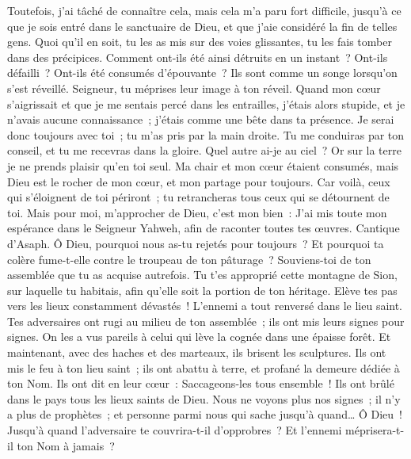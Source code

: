 \begin{multicols}{2}
Toutefois, j'ai tâché de connaître cela, mais cela m'a paru fort difficile,
jusqu'à ce que je sois entré dans le sanctuaire de Dieu, et que j'aie considéré la fin de telles gens.
Quoi qu'il en soit, tu les as mis sur des voies glissantes, tu les fais tomber dans des précipices.
Comment ont-ils été ainsi détruits en un instant~? Ont-ils défailli~? Ont-ils été consumés d'épouvante~?
Ils sont comme un songe lorsqu'on s'est réveillé. Seigneur, tu méprises leur image à ton réveil.
Quand mon cœur s'aigrissait et que je me sentais percé dans les entrailles,
j'étais alors stupide, et je n'avais aucune connaissance~; j'étais comme une bête dans ta présence.
Je serai donc toujours avec toi~; tu m'as pris par la main droite.
Tu me conduiras par ton conseil, et tu me recevras dans la gloire.
Quel autre ai-je au ciel~? Or sur la terre je ne prends plaisir qu'en toi seul.
Ma chair et mon cœur étaient consumés, mais Dieu est le rocher de mon cœur, et mon partage pour toujours.
Car voilà, ceux qui s'éloignent de toi périront~; tu retrancheras tous ceux qui se détournent de toi.
Mais pour moi, m'approcher de Dieu, c'est mon bien~: J'ai mis toute mon espérance dans le Seigneur Yahweh, afin de raconter toutes tes œuvres.
\VerseOne{}Cantique d'Asaph. Ô Dieu, pourquoi nous as-tu rejetés pour toujours~? Et pourquoi ta colère fume-t-elle contre le troupeau de ton pâturage~?
Souviens-toi de ton assemblée que tu as acquise autrefois. Tu t'es approprié cette montagne de Sion, sur laquelle tu habitais, afin qu'elle soit la portion de ton héritage.
Elève tes pas vers les lieux constamment dévastés~! L'ennemi a tout renversé dans le lieu saint.
Tes adversaires ont rugi au milieu de ton assemblée~; ils ont mis leurs signes pour signes.
On les a vus pareils à celui qui lève la cognée dans une épaisse forêt.
Et maintenant, avec des haches et des marteaux, ils brisent les sculptures.
Ils ont mis le feu à ton lieu saint~; ils ont abattu à terre, et profané la demeure dédiée à ton Nom.
Ils ont dit en leur cœur~: Saccageons-les tous ensemble~! Ils ont brûlé dans le pays tous les lieux saints de Dieu.
Nous ne voyons plus nos signes~; il n'y a plus de prophètes~; et personne parmi nous qui sache jusqu'à quand…
Ô Dieu~! Jusqu'à quand l'adversaire te couvrira-t-il d'opprobres~? Et l'ennemi méprisera-t-il ton Nom à jamais~?

\end{multicols}
